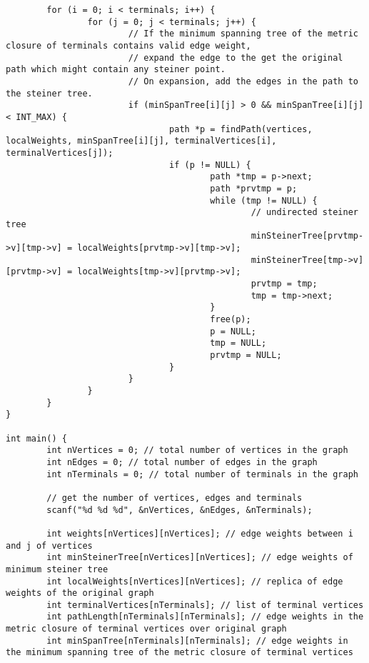 \documentclass[a4paper]{article}
\begin{document}
\begin{lstlisting}
        for (i = 0; i < terminals; i++) {
                for (j = 0; j < terminals; j++) {
                        // If the minimum spanning tree of the metric closure of terminals contains valid edge weight,
                        // expand the edge to the get the original path which might contain any steiner point.
                        // On expansion, add the edges in the path to the steiner tree.
                        if (minSpanTree[i][j] > 0 && minSpanTree[i][j] < INT_MAX) {
                                path *p = findPath(vertices, localWeights, minSpanTree[i][j], terminalVertices[i], terminalVertices[j]);
                                if (p != NULL) {
                                        path *tmp = p->next;
                                        path *prvtmp = p;
                                        while (tmp != NULL) {
                                                // undirected steiner tree
                                                minSteinerTree[prvtmp->v][tmp->v] = localWeights[prvtmp->v][tmp->v];
                                                minSteinerTree[tmp->v][prvtmp->v] = localWeights[tmp->v][prvtmp->v];
                                                prvtmp = tmp;
                                                tmp = tmp->next;
                                        }
                                        free(p);
                                        p = NULL;
                                        tmp = NULL;
                                        prvtmp = NULL;
                                }
                        }
                }
        }
}

int main() {
        int nVertices = 0; // total number of vertices in the graph
        int nEdges = 0; // total number of edges in the graph
        int nTerminals = 0; // total number of terminals in the graph

        // get the number of vertices, edges and terminals
        scanf("%d %d %d", &nVertices, &nEdges, &nTerminals);

        int weights[nVertices][nVertices]; // edge weights between i and j of vertices
        int minSteinerTree[nVertices][nVertices]; // edge weights of minimum steiner tree
        int localWeights[nVertices][nVertices]; // replica of edge weights of the original graph
        int terminalVertices[nTerminals]; // list of terminal vertices
        int pathLength[nTerminals][nTerminals]; // edge weights in the metric closure of terminal vertices over original graph
        int minSpanTree[nTerminals][nTerminals]; // edge weights in the minimum spanning tree of the metric closure of terminal vertices


\end{lstlisting}
\end{document}
